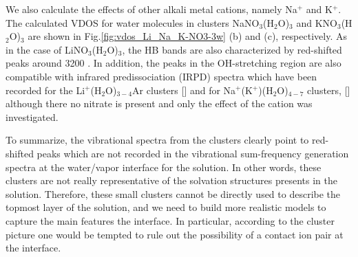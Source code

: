 %

We also calculate the effects of other alkali metal cations, namely Na$^+$ and K$^+$. 
The calculated VDOS for water molecules in clusters NaNO$_3$(H$_2$O)$_3$ and KNO$_3$(H$_2$O)$_3$ are shown in 
Fig.\thinspace\ref{fig:vdos_Li_Na_K-NO3-3w} (b) and (c), respectively. As in the case of LiNO$_3$(H$_2$O)$_3$, the HB 
bands are also characterized by red-shifted peaks around 3200 \centimeter.
In addition, the peaks in the OH-stretching region are also compatible with infrared predissociation
(IRPD) spectra which have been recorded for the Li$^+$(H$_2$O)$_{3-4}$Ar
clusters [\cite{rodriguez2011, Miller2008, Miller2008b}]
and for Na$^+$(K$^+$)(H$_2$O)$_{4-7}$ clusters, [\cite{beck2011}] although there no
nitrate is present and only the effect of the cation was investigated.

To summarize, the vibrational spectra from the clusters clearly point to red-shifted peaks which are not 
recorded in the vibrational sum-frequency generation spectra at the water/vapor interface for the \LiN solution. 
In other words, these clusters are not really representative of the solvation structures presents in the \LiN solution.
Therefore, these small clusters cannot be directly used to describe the topmost layer of the \LiN solution, 
and we need to build more realistic models to capture the main features the interface. 
In particular, according to the cluster picture one would be tempted to rule out the possibility of a contact 
ion pair at the interface.

